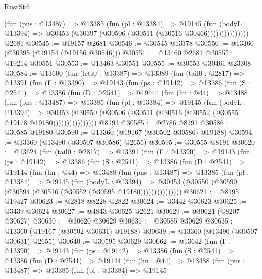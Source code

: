 \begin{lexlean}{RustStd}
\begin{coremodule}
                    (fun (pns : @13487) =>
                    @13385
                      (fun (pl : @13384) =>
                      @19145
                        (fun (bodyL : @13394) =>
                        @30453 (@30397 (@30506 (@30511 (@30516 @30466)))))))))))))))
    @2681
@30545 := @19157 @2681
@30546 := @30545 @13378
@30550 := @13360 (@30395 (@19154 (@19156 @30546)))
@30551 := @13460 @2681
@30552 := @19214 @30551
@30553 := @13463 @30551
@30555 := @30553 @30461 @23308
@30584 := @13600
    (fun (lets0 : @13387) =>
    @13389
      (fun (tail0 : @2817) =>
      @13391
        (fun (Γ : @13390) =>
        @19143
          (fun (ps : @19142) =>
          @13386
            (fun (S : @2541) =>
            @13386
              (fun (D : @2541) =>
              @19144
                (fun (hn : @44) =>
                @13488
                  (fun (pns : @13487) =>
                  @13385
                    (fun (pl : @13384) =>
                    @19145
                      (fun (bodyL : @13394) =>
                      @30453
                        (@30550
                          (@30506 (@30511 (@30516 (@30552 (@30555 @19178 @19180))))))))))))))))
    @8191
@30585 := @2786 @8191
@30586 := @30585 @19180
@30590 := @13360 (@19167 (@30502 @30586) @19188)
@30594 := @13360 (@13490 (@30507 @30586) @2655)
@30595 := @30555 @8191
@30620 := @13624
    (fun (tail0 : @2817) =>
    @13391
      (fun (Γ : @13390) =>
      @19143
        (fun (ps : @19142) =>
        @13386
          (fun (S : @2541) =>
          @13386
            (fun (D : @2541) =>
            @19144
              (fun (hn : @44) =>
              @13488
                (fun (pns : @13487) =>
                @13385
                  (fun (pl : @13384) =>
                  @19145
                    (fun (bodyL : @13394) =>
                    @30453 (@30550 (@30590 (@30594 (@30516 (@30552 (@30595 @19180)))))))))))))))
@30621 := @8195 @19427
@30623 := @2818 @8228 @2822
@30624 := @3442 @30623
@30625 := @3439 @30624
@30627 := @4843 @30625 @2621
@30629 := @30621 (@8207 @30627)
@30630 := @30620 @30629
@30631 := @30585 @30629
@30635 := @13360 (@19167 (@30502 @30631) @19188)
@30639 := @13360 (@13490 (@30507 @30631) @2655)
@30640 := @30595 @30629
@30662 := @13642
    (fun (Γ : @13390) =>
    @19143
      (fun (ps : @19142) =>
      @13386
        (fun (S : @2541) =>
        @13386
          (fun (D : @2541) =>
          @19144
            (fun (hn : @44) =>
            @13488
              (fun (pns : @13487) =>
              @13385
                (fun (pl : @13384) =>
                @19145

\end{coremodule}
\end{lexlean}
